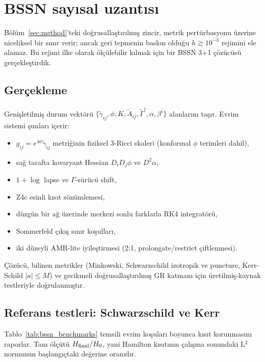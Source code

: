 \section{BSSN sayısal uzantısı}
\label{sec:bssn}

Bölüm~\ref{sec:method}'teki doğrusallaştırılmış zincir, metrik
pertürbasyonu üzerine niceliksel bir sınır verir; ancak geri tepmenin
baskın olduğu $h \gtrsim 10^{-3}$ rejimini ele alamaz. Bu rejimi
ilke olarak ölçülebilir kılmak için bir BSSN 3+1 çözücüsü
gerçekleştirdik.

\subsection{Gerçekleme}

Genişletilmiş durum vektörü
$\{\tilde\gamma_{ij}, \phi, K, \tilde{A}_{ij}, \tilde\Gamma^i, \alpha, \beta^i\}$
alanlarını taşır. Evrim sistemi şunları içerir:

\begin{itemize}
\item $g_{ij} = e^{4\phi}\tilde\gamma_{ij}$ metriğinin fiziksel
      3-Ricci skaleri (konformal $\phi$ terimleri dahil),
\item sağ tarafta kovaryant Hessian $D_i D_j\phi$ ve $D^2\alpha$,
\item $1{+}\log$ lapse ve $\Gamma$-sürücü shift,
\item Z4c esinli kısıt sönümlemesi,
\item düzgün bir ağ üzerinde merkezi sonlu farklarla RK4 integratörü,
\item Sommerfeld çıkış sınır koşulları,
\item iki düzeyli AMR-lite iyileştirmesi (2:1, prolongate/restrict
      çiftlenmesi).
\end{itemize}

Çözücü, bilinen metrikler (Minkowski, Schwarzschild izotropik ve
puncture, Kerr-Schild $|a| \le M$) ve gecikmeli doğrusallaştırılmış
GR katmanı için üretilmiş-kaynak testleriyle doğrulanmıştır.

\subsection{Referans testleri: Schwarzschild ve Kerr}

Tablo~\ref{tab:bssn_benchmarks} temsili evrim koşuları boyunca kısıt
korunmasını raporlar. Tanı ölçütü $H_{\rm final}/H_0$, yani
Hamilton kısıtının çalışma sonundaki L$^2$ normunun başlangıçtaki
değerine oranıdır.

